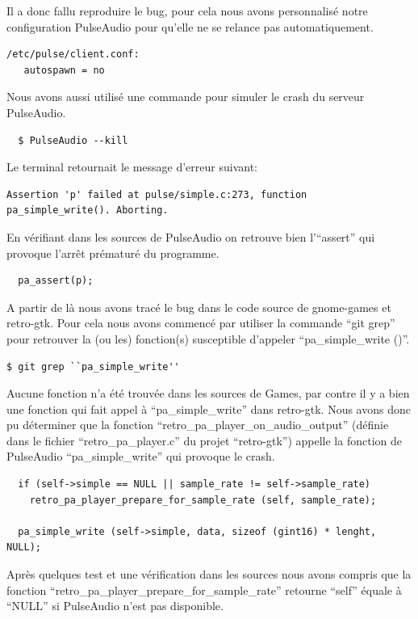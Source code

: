 \documentclass[12pt]{report}
\begin{document}
Il a donc fallu reproduire le bug, pour cela nous avons personnalisé notre
configuration PulseAudio pour qu'elle ne se relance pas automatiquement.
\begin{verbatim}
/etc/pulse/client.conf:
   autospawn = no
\end{verbatim}

Nous avons aussi utilisé une commande pour simuler le crash du serveur PulseAudio.
\begin{verbatim}
  $ PulseAudio --kill
\end{verbatim}

Le terminal retournait le message d'erreur suivant:
\begin{verbatim}
Assertion 'p' failed at pulse/simple.c:273, function pa_simple_write(). Aborting.
\end{verbatim}

En vérifiant dans les sources de PulseAudio on retrouve bien l'``assert'' qui provoque
l’arrêt prématuré du programme.
\begin{verbatim}
  pa_assert(p);
\end{verbatim}

A partir de là nous avons tracé le bug dans le code source de gnome-games et retro-gtk.
Pour cela nous avons commencé par utiliser la commande ``git grep'' pour retrouver
la (ou les) fonction(s) susceptible d'appeler ``pa\_simple\_write ()''.
\begin{verbatim}
$ git grep ``pa_simple_write''
\end{verbatim}

Aucune fonction n'a été trouvée dans les sources de Games, par contre il y a bien
une fonction qui fait appel à ``pa\_simple\_write'' dans retro-gtk.
Nous avons donc pu déterminer que la fonction
``retro\_pa\_player\_on\_audio\_output'' (définie dans le fichier
``retro\_pa\_player.c'' du projet ``retro-gtk'') appelle la fonction de PulseAudio
``pa\_simple\_write'' qui provoque le crash.

\begin{verbatim}
  if (self->simple == NULL || sample_rate != self->sample_rate)
    retro_pa_player_prepare_for_sample_rate (self, sample_rate);

  pa_simple_write (self->simple, data, sizeof (gint16) * lenght, NULL);
\end{verbatim}
  
Après quelques test et une vérification dans les sources nous  avons compris
que la fonction ``retro\_pa\_player\_prepare\_for\_sample\_rate'' retourne ``self''
équale à ``NULL'' si PulseAudio n'est pas disponible.
\end{document}
